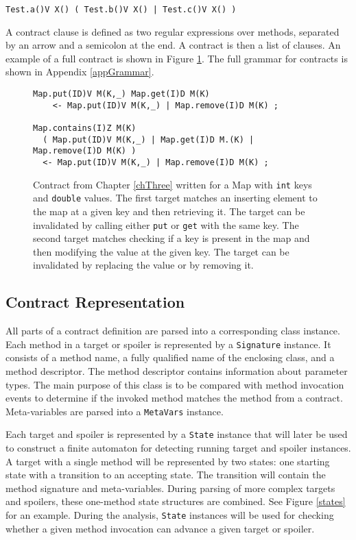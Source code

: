 \begin{lstlisting}
Test.a()V X() ( Test.b()V X() | Test.c()V X() )
\end{lstlisting}

A contract clause is defined as two regular expressions over methods, separated
by an arrow and a semicolon at the end. A contract is then a list of clauses. An
example of a full contract is shown in Figure \ref{contract}. The full grammar
for contracts is shown in Appendix \ref{appGrammar}.

\begin{figure}[hbt]
    \label{contract}
    \begin{lstlisting}
Map.put(ID)V M(K,_) Map.get(I)D M(K)
    <- Map.put(ID)V M(K,_) | Map.remove(I)D M(K) ;

Map.contains(I)Z M(K)
  ( Map.put(ID)V M(K,_) | Map.get(I)D M.(K) | Map.remove(I)D M(K) )
  <- Map.put(ID)V M(K,_) | Map.remove(I)D M(K) ;
\end{lstlisting}
    \caption{Contract from Chapter \ref{chThree} written for a Map with
    \texttt{int} keys and \texttt{double} values. The first target matches an
    inserting element to the map at a given key and then retrieving it. The
    target can be invalidated by calling either \texttt{put} or \texttt{get}
    with the same key. The second target matches checking if a key is present in
    the map and then modifying the value at the given key. The target can be
    invalidated by replacing the value or by removing it.}
\end{figure}

\subsection{Contract Representation}
All parts of a contract definition are parsed into a corresponding class
instance. Each method in a target or spoiler is represented by a
\texttt{Signature} instance. It consists of a method name, a fully qualified
name of the enclosing class, and a method descriptor. The method descriptor
contains information about parameter types. The main purpose of this class is to
be compared with method invocation events to determine if the invoked method
matches the method from a contract. Meta-variables are parsed into a
\texttt{MetaVars} instance.

Each target and spoiler is represented by a \texttt{State} instance that will
later be used to construct a finite automaton for detecting running target and
spoiler instances. A target with a single method will be represented by two
states: one starting state with a transition to an accepting state. The
transition will contain the method signature and meta-variables. During parsing
of more complex targets and spoilers, these one-method state structures are
combined. See Figure \ref{states} for an example. During the analysis,
\texttt{State} instances will be used for checking whether a given method
invocation can advance a given target or spoiler.

